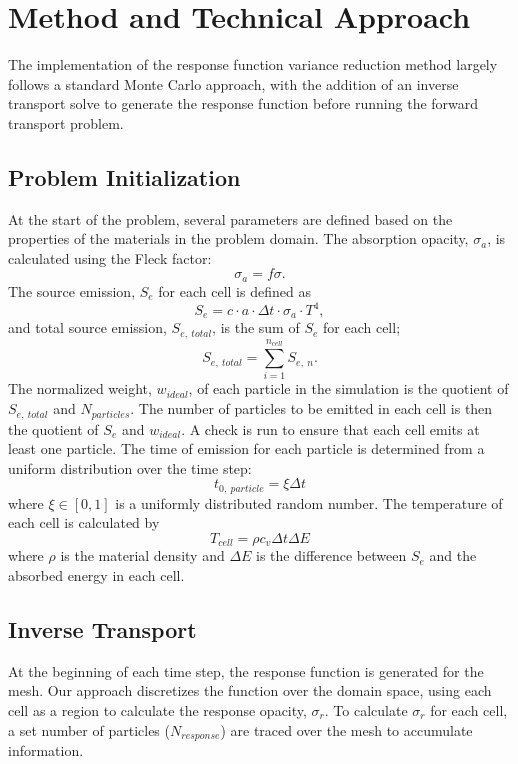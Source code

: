 \section{Method and Technical Approach}
The implementation of the response function variance reduction method largely follows a standard Monte Carlo approach, with the addition of an inverse transport solve to generate the response function before running the forward transport problem. 

\subsection{Problem Initialization}	
At the start of the problem, several parameters are defined based on the properties of the materials in the problem domain. The absorption opacity, $\sigma_{a}$, is calculated using the Fleck factor:
\begin{equation}
\sigma_{a} = f \sigma.
\end{equation}The source emission, $S_{e}$ for each cell is defined as
\begin{equation}
S_{e} = c \cdot a \cdot \Delta t \cdot \sigma_{a}  \cdot T^{4},
\end{equation}
and total source emission, $S_{e,~total}$, is the sum of $S_{e}$ for each cell;
\begin{equation}
S_{e,~total} = \sum_{i = 1}^{n_{cell}} S_{e,~n}.
\end{equation}
The normalized weight, $w_{ideal}$, of each particle in the simulation is the quotient of $S_{e,~total}$ and $N_{particles}$. The number of particles to be emitted in each cell is then the quotient of $S_{e}$ and $w_{ideal}$. A check is run to ensure that each cell emits at least one particle. The time of emission for each particle is determined from a uniform distribution over the time step:
\begin{equation}
t_{0,~particle} = \xi \Delta t
\end{equation}
where $\xi \in [0,1]$ is a uniformly distributed random number. The temperature of each cell is calculated by
\begin{equation} \label{Eq: cell_T}
T_{cell} = \rho c_{v} \Delta t \Delta E
\end{equation}
where $\rho$ is the material density and $\Delta E$ is the difference between $S_{e}$ and the absorbed energy in each cell.

\subsection{Inverse Transport}
At the beginning of each time step, the response function is generated for the mesh. Our approach discretizes the function over the domain space, using each cell as a region to calculate the response opacity, $\sigma_{r}$. To calculate $\sigma_{r}$ for each cell, a set number of particles ($N_{response}$) are traced over the mesh to accumulate information. 

